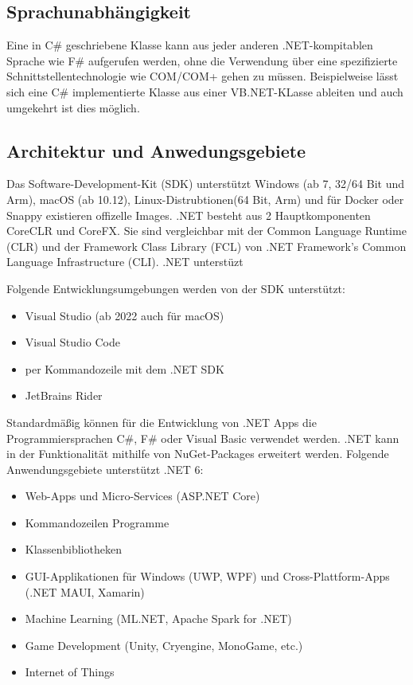 \subsection{Sprachunabhängigkeit}
Eine in C\# geschriebene Klasse kann aus jeder anderen .NET-kompitablen Sprache wie F\# aufgerufen werden, ohne die Verwendung über eine 
spezifizierte Schnittstellentechnologie wie COM/COM+ gehen zu müssen. Beispielweise lässt sich eine C\# implementierte Klasse aus einer 
VB.NET-KLasse ableiten und auch umgekehrt ist dies möglich.

\subsection{Architektur und Anwedungsgebiete}
Das Software-Development-Kit (SDK) unterstützt Windows (ab 7, 32/64 Bit und Arm), macOS (ab 10.12), Linux-Distrubtionen(64 Bit, Arm) 
und für Docker oder Snappy existieren offizelle Images. .NET besteht aus 2 Hauptkomponenten CoreCLR und CoreFX. 
Sie sind vergleichbar mit der Common Language Runtime (CLR) und der  Framework Class Library (FCL) 
von .NET Framework's Common Language Infrastructure (CLI). .NET unterstüzt 

Folgende Entwicklungsumgebungen werden von der SDK unterstützt:
\begin{itemize}
    \item Visual Studio (ab 2022 auch für macOS)
    \item Visual Studio Code
    \item per Kommandozeile mit dem .NET SDK
    \item JetBrains Rider 
\end{itemize}

Standardmäßig können für die Entwicklung von .NET Apps die Programmiersprachen C\#, F\# oder Visual Basic verwendet werden. 
.NET kann in der Funktionalität mithilfe von NuGet-Packages erweitert werden. Folgende Anwendungsgebiete unterstützt .NET 6:
\begin{itemize}
    \item Web-Apps und Micro-Services (ASP.NET Core)
    \item Kommandozeilen Programme
    \item Klassenbibliotheken
    \item GUI-Applikationen für Windows (UWP, WPF) und Cross-Plattform-Apps (.NET MAUI, Xamarin)
    \item Machine Learning (ML.NET, Apache Spark for .NET)
    \item Game Development (Unity, Cryengine, MonoGame, etc.)
    \item Internet of Things
\end{itemize}

